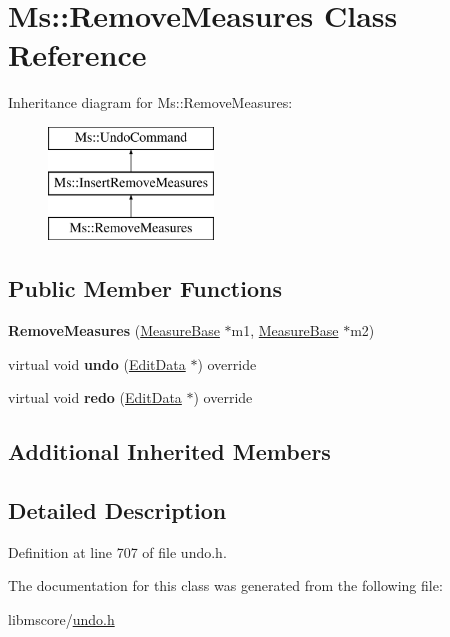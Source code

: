 \hypertarget{class_ms_1_1_remove_measures}{}\section{Ms\+:\+:Remove\+Measures Class Reference}
\label{class_ms_1_1_remove_measures}
Inheritance diagram for Ms\+:\+:Remove\+Measures\+:\begin{figure}[H]
\begin{center}
\leavevmode
\includegraphics[height=3.000000cm]{class_ms_1_1_remove_measures}
\end{center}
\end{figure}
\subsection*{Public Member Functions}
\begin{DoxyCompactItemize}
\item 
\mbox{\label{class_ms_1_1_remove_measures_a3a00fd04dfb6f0989708adfc1c533262}} 
{\bfseries Remove\+Measures} (\hyperlink{class_ms_1_1_measure_base}{Measure\+Base} $\ast$m1, \hyperlink{class_ms_1_1_measure_base}{Measure\+Base} $\ast$m2)
\item 
\mbox{\label{class_ms_1_1_remove_measures_ad516e041598664d6c20812f27804809e}} 
virtual void {\bfseries undo} (\hyperlink{class_ms_1_1_edit_data}{Edit\+Data} $\ast$) override
\item 
\mbox{\label{class_ms_1_1_remove_measures_a576c9917841adc92d655ecfed49da1f9}} 
virtual void {\bfseries redo} (\hyperlink{class_ms_1_1_edit_data}{Edit\+Data} $\ast$) override
\end{DoxyCompactItemize}
\subsection*{Additional Inherited Members}


\subsection{Detailed Description}


Definition at line 707 of file undo.\+h.



The documentation for this class was generated from the following file\+:\begin{DoxyCompactItemize}
\item 
libmscore/\hyperlink{undo_8h}{undo.\+h}\end{DoxyCompactItemize}
